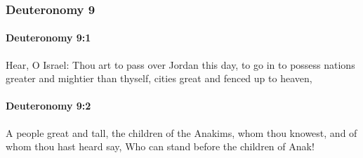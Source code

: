 	\subsubsection{Deuteronomy 9} %
		\label{DEUTERONOMY-9}

		\paragraph{Deuteronomy 9:1} %
			\label{DEUTERONOMY-9-1}

			Hear, O Israel: Thou art to pass over Jordan this day, to go in to possess nations greater and mightier than thyself, cities great and fenced up to heaven,


		\paragraph{Deuteronomy 9:2} %
			\label{DEUTERONOMY-9-2}

			A people great and tall, the children of the Anakims, whom thou knowest, and of whom thou hast heard say, Who can stand before the children of Anak!

